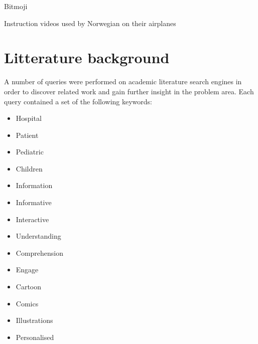Bitmoji

Instruction videos used by Norwegian on their airplanes

\section{Litterature background}

A number of queries were performed on academic literature search engines in order to discover related work and gain further insight in the problem area. Each query contained a set of the following keywords:

\begin{multicols}{3}
    \raggedcolumns
    \begin{itemize}
        \item Hospital
        \item Patient
        \item Pediatric
        \item Children
        \item Information
        \item Informative
        \item Interactive
        \item Understanding
        \item Comprehension
        \item Engage
        \item Cartoon
        \item Comics
        \item Illustrations
        \item Personalised
    \end{itemize}
\end{multicols}

